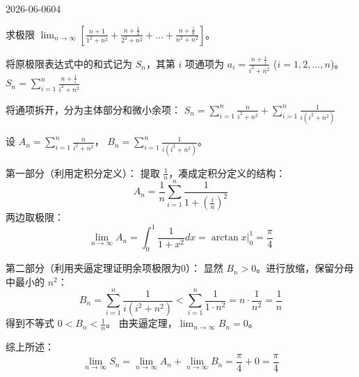 \begin{mistake}{2026-06-06}{04}

\begin{problemcontent}
求极限 $\lim_{n \to \infty} \left[ \frac{n+1}{1^2+n^2} + \frac{n+\frac{1}{2}}{2^2+n^2} + \dots + \frac{n+\frac{1}{n}}{n^2+n^2} \right]$。
\end{problemcontent}

\begin{solutioncontent}
将原极限表达式中的和式记为 $S_n$，其第 $i$ 项通项为 $a_i = \frac{n+\frac{1}{i}}{i^2+n^2}$ ($i = 1, 2, \dots, n$)。
$S_n = \sum_{i=1}^n \frac{n+\frac{1}{i}}{i^2+n^2}$

将通项拆开，分为主体部分和微小余项：
$S_n = \sum_{i=1}^n \frac{n}{i^2+n^2} + \sum_{i=1}^n \frac{1}{i(i^2+n^2)}$

设 $A_n = \sum_{i=1}^n \frac{n}{i^2+n^2}$， $B_n = \sum_{i=1}^n \frac{1}{i(i^2+n^2)}$。

第一部分（利用定积分定义）：
提取 $\frac{1}{n}$，凑成定积分定义的结构：
\[
A_n = \frac{1}{n} \sum_{i=1}^n \frac{1}{1+\left(\frac{i}{n}\right)^2}
\]
两边取极限：
\[
\lim_{n \to \infty} A_n = \int_0^1 \frac{1}{1+x^2} dx = \left. \arctan x \right|_0^1 = \frac{\pi}{4}
\]

第二部分（利用夹逼定理证明余项极限为0）：
显然 $B_n > 0$。进行放缩，保留分母中最小的 $n^2$：
\[
B_n = \sum_{i=1}^n \frac{1}{i(i^2+n^2)} < \sum_{i=1}^n \frac{1}{1 \cdot n^2} = n \cdot \frac{1}{n^2} = \frac{1}{n}
\]
得到不等式 $0 < B_n < \frac{1}{n}$。
由夹逼定理，$\lim_{n \to \infty} B_n = 0$。

综上所述：
\[
\lim_{n \to \infty} S_n = \lim_{n \to \infty} A_n + \lim_{n \to \infty} B_n = \frac{\pi}{4} + 0 = \frac{\pi}{4}
\]
\end{solutioncontent}


\end{mistake}

